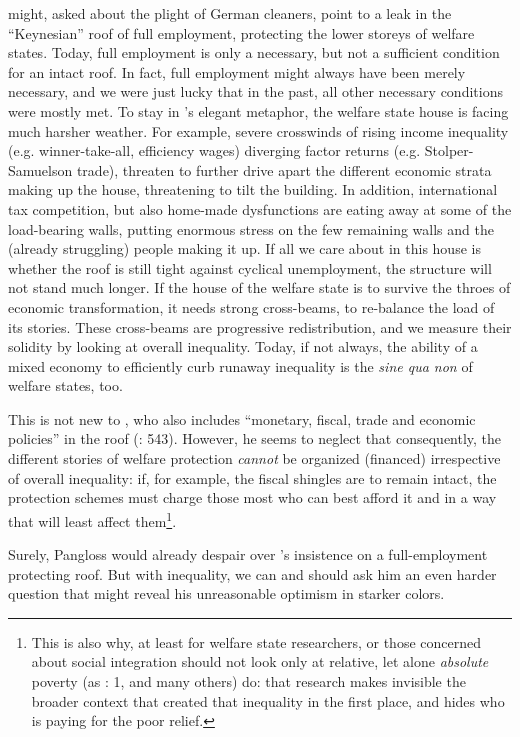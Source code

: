 \documentclass[11pt,a4paper,oneside,openright]{article}
\begin{document}
\begin{enumerate}
	\citeauthor{Offe2003} might, asked about the plight of German cleaners, point to a leak in the ``Keynesian'' roof of full employment, protecting the lower storeys of welfare states. 
	Today, full employment is only a necessary, but not a sufficient condition for an intact roof. 
	In fact, full employment might always have been merely necessary, and we were just lucky that in the past, all other necessary conditions were mostly met. 
	To stay in \citeauthor{Offe2003}'s elegant metaphor, the welfare state house is facing much harsher weather. 
	For example, severe crosswinds of rising income inequality (e.g. winner-take-all, efficiency wages) diverging factor returns (e.g. Stolper-Samuelson trade), threaten to further drive apart the different economic strata making up the house, threatening to tilt the building. 
	In addition, international tax competition, but also home-made dysfunctions are eating away at some of the load-bearing walls, putting enormous stress on the few remaining walls and the (already struggling) people making it up. 
	If all we care about in this house is whether the roof is still tight against cyclical unemployment, the structure will not stand much longer. 
	If the house of the welfare state is to survive the throes of economic transformation, it needs strong cross-beams, to re-balance the load of its stories. 
	These cross-beams are progressive redistribution, and we measure their solidity by looking at overall inequality. 
	Today, if not always, the ability of a mixed economy to efficiently curb runaway inequality is the \emph{sine qua non} of welfare states, too. 
	
	This is not new to \cite{Offe2003}, who also includes ``monetary, fiscal, trade and economic policies'' in the roof (\citeyear{Offe2003}: 543). 
	However, he seems to neglect that consequently, the different stories of welfare protection \emph{cannot} be organized (financed) irrespective of overall inequality: 
	if, for example, the fiscal shingles are to remain intact, the protection schemes must charge those most who can best afford it and in a way that will least affect them\footnote{
		This is also why, at least for welfare state researchers, or those concerned about social integration should not look only at relative, let alone \emph{absolute} poverty (as \citealt{Grow2005}: 1, and many others) do: 
		that research makes invisible the broader context that created that inequality in the first place, and hides who is paying for the poor relief.}. 
	
	Surely, Pangloss would already despair over \cite{Offe2003}'s insistence on a full-employment protecting roof. 
	But with inequality, we can and should ask him an even harder question that might reveal his unreasonable optimism in starker colors.
	

\end{enumerate}
\end{document}
